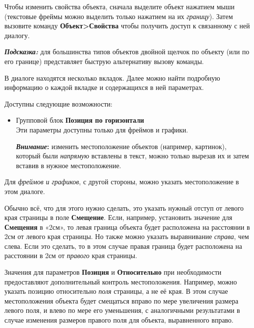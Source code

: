 \documentclass[a4paper,10pt]{article}
\begin{document}
Чтобы изменить свойства объекта, сначала выделите объект нажатием мыши (текстовые фреймы можно выделить только нажатием на их \textit{границу}). Затем вызовите команду \textbf{Объект>Свойства} чтобы получить доступ к связанному с ней диалогу.

\begin{mdframed}[backgroundcolor=blue!10]
\textbf{\textit{Подсказка:}} для большинства типов объектов двойной щелчок по объекту (или по его границе) представляет быструю альтернативу вызову команды.
\end{mdframed}

В диалоге находятся несколько вкладок. Далее можно найти подробную информацию о каждой вкладке и содержащихся в ней параметрах.

Доступны следующие возможности:

\begin{itemize}
 \item Групповой блок \textbf{Позиция по горизонтали}\\
 Эти параметры доступны только для фреймов и графики.
 
 \begin{mdframed}[backgroundcolor=blue!10]
\textbf{\textit{Внимание}:} изменить местоположение объектов (например, картинок), который были \textit{напрямую} вставлены в текст, можно только вырезав их и затем вставив в нужное местоположение.
\end{mdframed}
\end{itemize}

Для \textit{фреймов и графиков}, с другой стороны, можно указать местоположение в этом диалоге.

Обычно всё, что для этого нужно сделать, это указать нужный отступ от левого края страницы в поле \textbf{Смещение}. Если, например, установить значение для \textbf{Смещения} в «2см», то левая граница объекта будет расположена на расстоянии в 2см от левого края страницы. Но также можно указать выравнивание \textit{справа}, чем слева. Если это сделать, то в этом случае правая граница будет расположена на расстоянии в 2см от \textit{правого} края страницы.

Значения для параметров \textbf{Позиция} и \textbf{Относительно} при необходимости предоставляют дополнительный контроль местоположения. Например, можно указать позицию относительно \textit{поля} страницы, а не её края. В этом случае местоположения объекта будет смещаться вправо по мере увеличения размера левого поля, и влево по мере его уменьшения, с аналогичными результатами в случае изменения размеров правого поля для объекта, выравненного вправо.
\end{document}
